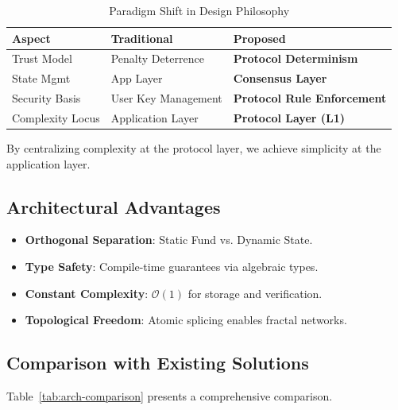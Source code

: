 \begin{table}[htbp]
\centering
\caption{Paradigm Shift in Design Philosophy}
\label{tab:paradigm}
\small
\begin{tabularx}{\linewidth}{@{}l X X@{}}
\toprule
\textbf{Aspect} & \textbf{Traditional} & \textbf{Proposed} \\
\midrule
Trust Model & Penalty Deterrence & \textbf{Protocol Determinism} \\
State Mgmt & App Layer & \textbf{Consensus Layer} \\
Security Basis & User Key Management & \textbf{Protocol Rule Enforcement} \\
Complexity Locus & Application Layer & \textbf{Protocol Layer (L1)} \\
\bottomrule
\end{tabularx}
\end{table}

By centralizing complexity at the protocol layer, we achieve simplicity at the application layer.

\subsection{Architectural Advantages}

\begin{itemize}
    \item \textbf{Orthogonal Separation}: Static Fund vs. Dynamic State.
    \item \textbf{Type Safety}: Compile-time guarantees via algebraic types.
    \item \textbf{Constant Complexity}: $\mathcal{O}(1)$ for storage and verification.
    \item \textbf{Topological Freedom}: Atomic splicing enables fractal networks.
\end{itemize}

\subsection{Comparison with Existing Solutions}

Table~\ref{tab:arch-comparison} presents a comprehensive comparison.

